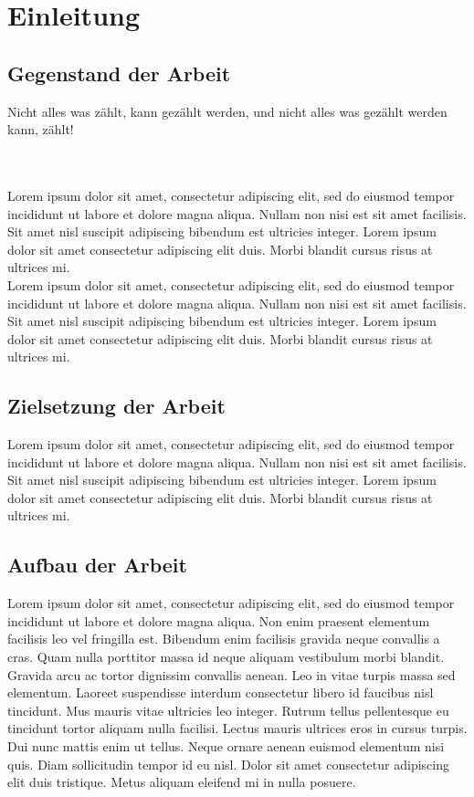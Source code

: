 \section{Einleitung}\label{einleitung}
\subsection{Gegenstand der Arbeit}
\begin{itshape}\au Nicht alles was zählt, kann gezählt werden, und nicht alles was gezählt werden
kann, zählt!\ao\end{itshape}  
\\\\
Lorem ipsum dolor sit amet, consectetur adipiscing elit, sed do eiusmod tempor incididunt ut labore et dolore magna aliqua. Nullam non nisi est sit amet facilisis. Sit amet nisl suscipit adipiscing bibendum est ultricies integer. Lorem ipsum dolor sit amet consectetur adipiscing elit duis. Morbi blandit cursus risus at ultrices mi.
\\
Lorem ipsum dolor sit amet, consectetur adipiscing elit, sed do eiusmod tempor incididunt ut labore et dolore magna aliqua. Nullam non nisi est sit amet facilisis. Sit amet nisl suscipit adipiscing bibendum est ultricies integer. Lorem ipsum dolor sit amet consectetur adipiscing elit duis. Morbi blandit cursus risus at ultrices mi.
\subsection{Zielsetzung der Arbeit}
Lorem ipsum dolor sit amet, consectetur adipiscing elit, sed do eiusmod tempor incididunt ut labore et dolore magna aliqua. Nullam non nisi est sit amet facilisis. Sit amet nisl suscipit adipiscing bibendum est ultricies integer. Lorem ipsum dolor sit amet consectetur adipiscing elit duis. Morbi blandit cursus risus at ultrices mi.
\subsection{Aufbau der Arbeit}
Lorem ipsum dolor sit amet, consectetur adipiscing elit, sed do eiusmod tempor incididunt ut labore et dolore magna aliqua. Non enim praesent elementum facilisis leo vel fringilla est. Bibendum enim facilisis gravida neque convallis a cras. Quam nulla porttitor massa id neque aliquam vestibulum morbi blandit. Gravida arcu ac tortor dignissim convallis aenean. Leo in vitae turpis massa sed elementum. Laoreet suspendisse interdum consectetur libero id faucibus nisl tincidunt. Mus mauris vitae ultricies leo integer. Rutrum tellus pellentesque eu tincidunt tortor aliquam nulla facilisi. Lectus mauris ultrices eros in cursus turpis. Dui nunc mattis enim ut tellus. Neque ornare aenean euismod elementum nisi quis. Diam sollicitudin tempor id eu nisl. Dolor sit amet consectetur adipiscing elit duis tristique. Metus aliquam eleifend mi in nulla posuere.
\newpage
